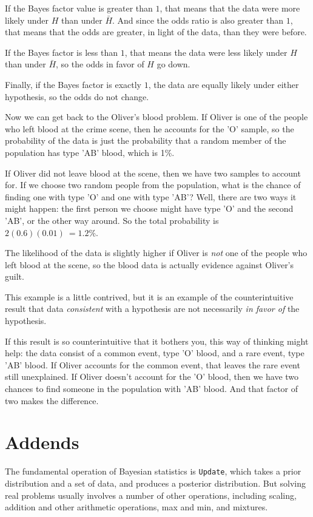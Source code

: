 \documentclass[12pt]{book}
\begin{document}
If the Bayes factor value is greater than $1$, that means that the
data were more likely under $H$ than under $\bar{H}$.  And since the
odds ratio is also greater than $1$, that means that the odds are
greater, in light of the data, than they were before.

If the Bayes factor is less than $1$, that means the data were
less likely under $H$ than under $\bar{H}$, so the odds in
favor of $H$ go down.

Finally, if the Bayes factor is exactly $1$, the data are equally
likely under either hypothesis, so the odds do not change.

Now we can get back to the Oliver's blood problem.  If Oliver is
one of the people who left blood at the crime scene, then he
accounts for the 'O' sample, so the probability of the data
is just the probability that a random member of the population
has type 'AB' blood, which is 1\%.

If Oliver did not leave blood at the scene, then we have two
samples to account for.  If we choose two random people from
the population, what is the chance of finding one with type 'O'
and one with type 'AB'?  Well, there are two ways it might happen:
the first person we choose might have type 'O' and the second
'AB', or the other way around.  So the total probability is
$2 (0.6) (0.01)\ = 1.2\%$.

The likelihood of the data is slightly higher if Oliver is
{\it not} one of the people who left blood at the scene, so
the blood data is actually evidence against Oliver's guilt.

This example is a little contrived, but it is an example of
the counterintuitive result that data {\it consistent} with
a hypothesis are not necessarily {\it in favor of}
the hypothesis.

If this result is so counterintuitive that it bothers you,
this way of thinking might help: the data consist of a common
event, type 'O' blood, and a rare event, type 'AB' blood.
If Oliver accounts for the common event, that leaves the rare
event still unexplained.  If Oliver doesn't account for the
'O' blood, then we have two chances to find someone in the
population with 'AB' blood.  And that factor of two makes
the difference.


\section{Addends}
\label{addends}

The fundamental operation of Bayesian statistics is
{\tt Update}, which takes a prior distribution and a set
of data, and produces a posterior distribution.  But solving
real problems usually involves a number of other operations,
including scaling, addition and other arithmetic operations,
max and min, and mixtures.
\end{document}
